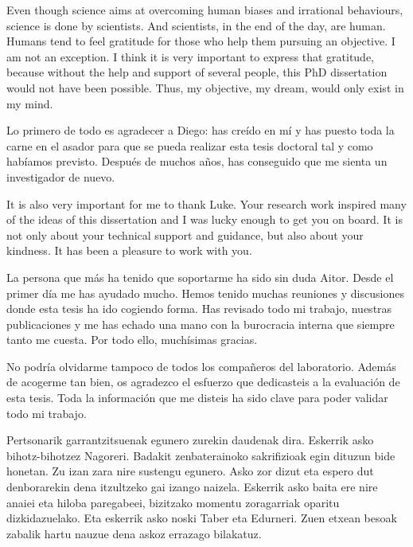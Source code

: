 


\begin{acknowledgements}      
Even though science aims at overcoming human biases and irrational behaviours, science is done by scientists. And scientists, in the end of the day, are human. Humans tend to feel gratitude for those who help them pursuing an objective. I am not an exception. I think it is very important to express that gratitude, because without the help and support of several people, this PhD dissertation would not have been possible. Thus, my objective, my dream, would only exist in my mind.


Lo primero de todo es agradecer a Diego: has creído en mí y has puesto toda la carne en el asador para que se pueda realizar esta tesis doctoral tal y como habíamos previsto. Después de muchos años, has conseguido que me sienta un investigador de nuevo. 


It is also very important for me to thank Luke. Your research work inspired many of the ideas of this dissertation and I was lucky enough to get you on board. It is not only about your technical support and guidance, but also about your kindness. It has been a pleasure to work with you.


La persona que más ha tenido que soportarme ha sido sin duda Aitor. Desde el primer día me has ayudado mucho. Hemos tenido muchas reuniones y discusiones donde esta tesis ha ido cogiendo forma. Has revisado todo mi trabajo, nuestras publicaciones y me has echado una mano con la burocracia interna que siempre tanto me cuesta. Por todo ello, muchísimas gracias.

No podría olvidarme tampoco de todos los compañeros del laboratorio. Además de acogerme tan bien, os agradezco el esfuerzo que dedicasteis a la evaluación de esta tesis. Toda la información que me disteis ha sido clave para poder validar todo mi trabajo.


Pertsonarik garrantzitsuenak egunero zurekin daudenak dira. Eskerrik asko bihotz-bihotzez Nagoreri. Badakit zenbaterainoko sakrifizioak egin dituzun bide honetan. Zu izan zara nire sustengu egunero. Asko zor dizut eta espero dut denborarekin dena itzultzeko gai izango naizela. Eskerrik asko baita ere nire anaiei eta hiloba paregabeei, bizitzako momentu zoragarriak oparitu dizkidazuelako. Eta eskerrik asko noski Taber eta Edurneri. Zuen etxean besoak zabalik hartu nauzue dena askoz errazago bilakatuz.


\end{acknowledgements}
